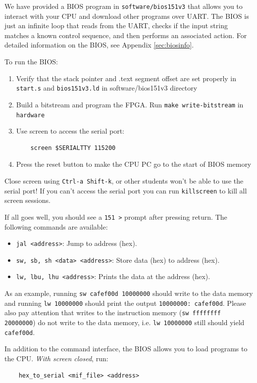 \documentclass[11pt]{article}
\begin{document}
We have provided a BIOS program in \verb|software/bios151v3| that allows you to interact with your CPU and download other programs over UART.
The BIOS is just an infinite loop that reads from the UART, checks if the input string matches a known control sequence, and then performs an associated action.
For detailed information on the BIOS, see Appendix \ref{sec:biosinfo}.

To run the BIOS:
\begin{enumerate}
  \item Verify that the stack pointer and .text segment offset are set properly in \verb|start.s| and \verb|bios151v3.ld| in software/bios151v3 directory
  \item Build a bitstream and program the FPGA. Run \verb|make write-bitstream| in \verb|hardware|
  \item Use screen to access the serial port:
    \begin{verbatim}
    screen $SERIALTTY 115200
    \end{verbatim}
  \item Press the reset button to make the CPU PC go to the start of BIOS memory
\end{enumerate}

Close screen using \verb|Ctrl-a Shift-k|, or other students won't be able to use the serial port!
If you can't access the serial port you can run \verb|killscreen| to kill all screen sessions.

If all goes well, you should see a \verb|151 >| prompt after pressing return. The following commands are available:
\begin{itemize}
    \item \verb|jal <address>|: Jump to address (hex).
    \item \verb|sw, sb, sh <data> <address>|: Store data (hex) to address (hex).
    \item \verb|lw, lbu, lhu <address>|: Prints the data at the address (hex).
\end{itemize}

As an example, running \verb|sw cafef00d 10000000| should write to the data memory and running \verb|lw 10000000| should print the output \verb|10000000: cafef00d|.
Please also pay attention that writes to the instruction memory (\verb|sw ffffffff 20000000|) do not write to the data memory, i.e. \verb|lw 10000000| still should yield \verb|cafef00d|.

In addition to the command interface, the BIOS allows you to load programs to the CPU. \textit{With screen closed}, run:
\begin{verbatim}
    hex_to_serial <mif_file> <address>
\end{verbatim}
\end{document}
